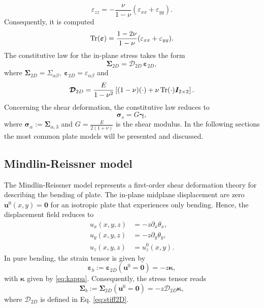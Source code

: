\begin{equation*}
\varepsilon_{zz} = - \frac{\nu}{1 - \nu} (\varepsilon_{xx} + \varepsilon_{yy}).
\end{equation*}
Consequently, it is computed
\begin{equation*}
\operatorname{Tr}(\bm{\varepsilon}) = \frac{1 - 2\nu}{1 - \nu} (\varepsilon_{xx} + \varepsilon_{yy}).
\end{equation*}
The constitutive law for the in-plane stress takes the form
\begin{equation*}
\bm{\Sigma}_{2D} = \bm{\mathcal{D}}_{2D} \, \bm{\varepsilon}_{2D},
\end{equation*}
where $\bm{\Sigma}_{2D} = \Sigma_{\alpha\beta}, \; \bm{\varepsilon}_{2D} = \varepsilon_{\alpha\beta}$ and 
\begin{equation}\label{eq:stiff2D}
\bm{\mathcal{D}}_{2D} = \frac{E}{1-\nu^2}\left[ (1-\nu) (\cdot) + {\nu} \operatorname{Tr}(\cdot) \bm{I}_{2\times 2} \right].
\end{equation}
Concerning the shear deformation, the constitutive law reduces to 
\begin{equation}
\bm{\sigma}_s = G \bm{\gamma},
\end{equation}
where $\bm{\sigma}_\alpha := \bm{\Sigma}_{\alpha, 3}$ and $G = \frac{E}{2(1 + \nu)}$ is the shear modulus. In the following sections the most common plate models will be presented and discussed.

\subsection{Mindlin-Reissner model}
The Mindlin-Reissner model \cite{mindlin1951} represents a first-order shear deformation theory for describing the bending of plate. The in-plane midplane displacement are zero $\bm{u}^0(x,y)=\bm{0}$ for an isotropic plate that experiences only bending. Hence, the displacement field reduces to
\begin{equation}
\begin{aligned}
u_x(x,y,z) &= -z \partial_x \theta_x, \\
u_y(x,y,z) &= -z \partial_y \theta_y, \\
u_z(x,y,z) &= u_z^0(x,y).
\end{aligned}
\end{equation}
In pure bending, the strain tensor is given by
\begin{equation*}
\bm{\varepsilon}_b := \bm\varepsilon_{2D}(\bm{u}^0=\bm{0}) = -z \bm{\kappa},
\end{equation*}
with $\bm\kappa$ given by \eqref{eq:kappa}. Consequently, the stress tensor reads
\begin{equation*}
\bm{\Sigma}_b := \bm{\Sigma}_{2D}(\bm{u}^0=\bm{0}) = -z \bm{\mathcal{D}}_{2D} \bm{\kappa},
\end{equation*}
where $\bm{\mathcal{D}}_{2D}$ is defined in Eq. \eqref{eq:stiff2D}. \\

